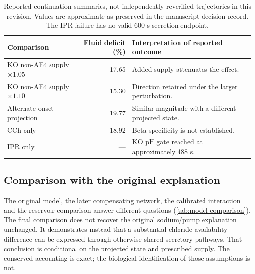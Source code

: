 \begin{table}[t]
\centering
\caption{Reported continuation summaries, not independently reverified trajectories in this revision. Values are approximate as preserved in the manuscript decision record. The IPR failure has no valid 600 s secretion endpoint.}
\label{tab:reported-sensitivities}
\begin{tabularx}{\textwidth}{l r X}
\toprule
Comparison & Fluid deficit (\%) & Interpretation of reported outcome\\
\midrule
KO non-AE4 supply $\times1.05$ & 17.65 & Added supply attenuates the effect.\\
KO non-AE4 supply $\times1.10$ & 15.30 & Direction retained under the larger perturbation.\\
Alternate onset projection & 19.77 & Similar magnitude with a different projected state.\\
CCh only & 18.92 & Beta specificity is not established.\\
IPR only & --- & KO pH gate reached at approximately 488 s.\\
\bottomrule
\end{tabularx}
\end{table}

\subsection{Comparison with the original explanation}

The original model, the later compensating network, the calibrated interaction and the reservoir comparison answer different questions (\cref{tab:model-comparison}). The final comparison does not recover the original sodium/pump explanation unchanged. It demonstrates instead that a substantial chloride availability difference can be expressed through otherwise shared secretory pathways. That conclusion is conditional on the projected state and prescribed supply. The conserved accounting is exact; the biological identification of those assumptions is not.

